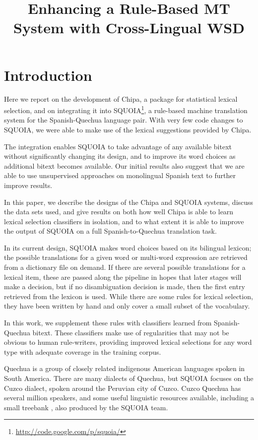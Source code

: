 \documentclass[10pt, a4paper]{article}
\title{Enhancing a Rule-Based MT System with Cross-Lingual WSD}
\begin{document}
\maketitleabstract

\section{Introduction}
Here we report on the development of Chipa, a package for statistical
lexical selection, and on integrating it into
SQUOIA\footnote{\url{http://code.google.com/p/squoia/}}, a rule-based
machine translation system for the Spanish-Quechua language pair.  With very
few code changes to SQUOIA, we were able to make use of the lexical suggestions
provided by Chipa.

The integration enables SQUOIA to take advantage of any available bitext
without significantly changing its design, and to improve its word choices as
additional bitext becomes available. Our initial results also suggest that we
are able to use unsupervised approaches on monolingual Spanish text to further
improve results.

In this paper, we describe the designs of the Chipa and SQUOIA systems, discuss
the data sets used, and give results on both how well Chipa is able to learn
lexical selection classifiers in isolation, and to what extent it is able to
improve the output of SQUOIA on a full Spanish-to-Quechua translation task.

In its current design, SQUOIA makes word choices based on its bilingual
lexicon; the possible translations for a given word or multi-word expression
are retrieved from a dictionary file on demand. If there are several possible
translations for a lexical item, these are passed along the pipeline in hopes
that later stages will make a decision, but if no disambiguation decision is
made, then the first entry retrieved from the lexicon is used. While there are
some rules for lexical selection, they have been written by hand and only cover
a small subset of the vocabulary.

In this work, we supplement these rules with classifiers learned from
Spanish-Quechua bitext. These classifiers make use of regularities that may not
be obvious to human rule-writers, providing improved lexical selections for
any word type with adequate coverage in the training corpus.

Quechua is a group of closely related indigenous American languages spoken in
South America. There are many dialects of Quechua, but SQUOIA focuses on the
Cuzco dialect, spoken around the Peruvian city of Cuzco.  Cuzco Quechua has
several million speakers, and some useful linguistic resources available,
including a small treebank \cite{rios2009quechua}, also produced by the SQUOIA
team.
\end{document}
